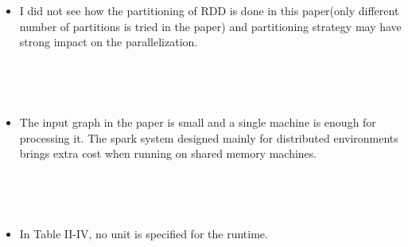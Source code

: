 \begin{itemize}
~


~


\item I did not see how the partitioning of RDD is done in this paper(only different number of partitions is tried in the paper) and partitioning strategy may have strong impact on the parallelization.

~


~

\item The input graph in the paper is small and a single machine is enough for processing it. The spark system designed mainly for distributed environments brings extra cost when running on shared memory machines. 

~


~

\item In Table II-IV, no unit is specified for the runtime. 

~


~

\end{itemize}


